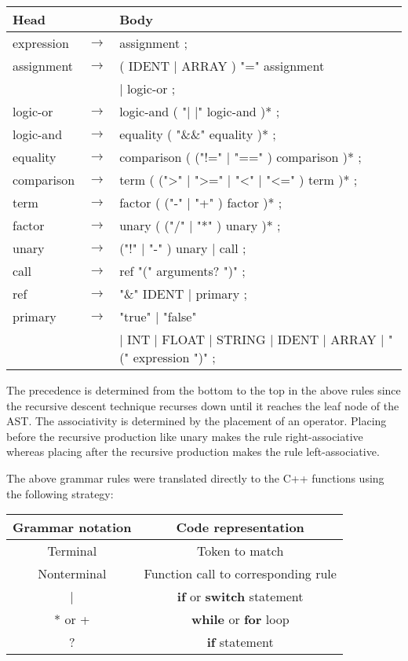 \documentclass[manuscript,screen,nonacm]{acmart}
\begin{document}
\begin{center}
\begin{tabular}{l l l}
    \hline
    Head & & Body \\
    \hline
    expression & $\rightarrow$ & assignment ; \\
    assignment & $\rightarrow$ & ( IDENT | ARRAY ) "=" assignment \\
    ~ & ~ & | logic-or ; \\
    logic-or & $\rightarrow$ & logic-and ( "| |" logic-and )* ; \\
    logic-and & $\rightarrow$ & equality ( "\&\&" equality )* ; \\
    equality & $\rightarrow$ & comparison ( ("!=" | "==" ) comparison )* ; \\
    comparison & $\rightarrow$ & term ( (">" | ">=" | "<" | "<=" ) term )* ; \\
    term & $\rightarrow$ & factor ( ("-" | "+" ) factor )* ; \\
    factor & $\rightarrow$ & unary ( ("/" | "*" ) unary )* ; \\
    unary & $\rightarrow$ & ("!" | "-" ) unary | call ; \\
    call & $\rightarrow$ & ref "(" arguments? ")" ; \\
    ref & $\rightarrow$ &  "\&" IDENT | primary ; \\
    primary & $\rightarrow$ & "true" | "false" \\
    ~ & ~ & | INT | FLOAT | STRING | IDENT | ARRAY | "(" expression ")" ; \\
    \hline
\end{tabular}
\end{center}

The precedence is determined from the bottom to the top in the above rules since the recursive descent technique recurses down until it reaches the leaf node of the AST. The associativity is determined by the placement of an operator. Placing before the recursive production like unary makes the rule right-associative whereas placing after the recursive production makes the rule left-associative.

The above grammar rules were translated directly to the C++ functions using the following strategy:

\begin{center}
\begin{tabular}{|c|c|}
    \hline
    Grammar notation & Code representation \\
    \hline
    Terminal & Token to match \\
    Nonterminal & Function call to corresponding rule \\
    | & \textbf{if} or \textbf{switch} statement \\
    * or + & \textbf{while} or \textbf{for} loop \\
    ? & \textbf{if} statement \\
    \hline
\end{tabular}
\end{center}
\end{document}
